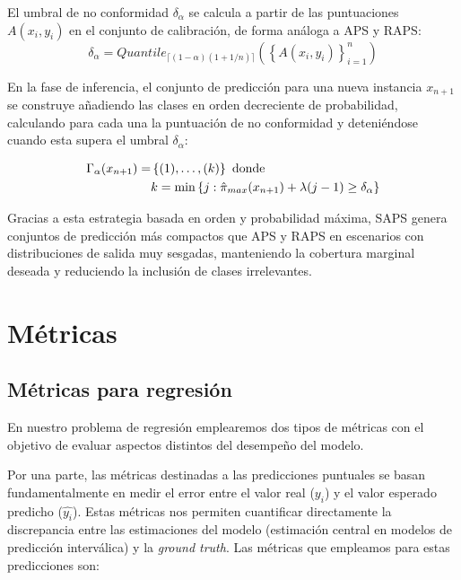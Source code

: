 El umbral de no conformidad $\delta_\alpha$ se calcula a partir de las puntuaciones $A(x_i, y_i)$ en el conjunto de calibración, de forma análoga a APS y RAPS:
$$
\delta_\alpha = Quantile_{\lceil (1-\alpha)(1+1/n) \rceil} \left( \left\{ A(x_i, y_i) \right\}_{i=1}^n \right)
$$

En la fase de inferencia, el conjunto de predicción para una nueva instancia $x_{n+1}$ se construye añadiendo las clases en orden decreciente de probabilidad, calculando para cada una la puntuación de no conformidad y deteniéndose cuando esta supera el umbral $\delta_\alpha$:

\begin{align*}
\Gamma_\alpha(x_{n+1}) = &\left\{ (1), \dots, (k) \right\} \ \textnormal{donde} \\
& k = \min \left\{ j : \hat{\pi}_{max}(x_{n+1}) + \lambda (j - 1) \ge \delta_\alpha \right\}
\end{align*}

Gracias a esta estrategia basada en orden y probabilidad máxima, SAPS genera conjuntos de predicción más compactos que APS y RAPS en escenarios con distribuciones de salida muy sesgadas, manteniendo la cobertura marginal deseada y reduciendo la inclusión de clases irrelevantes.



\section{Métricas}


\subsection{Métricas para regresión}

En nuestro problema de regresión emplearemos dos tipos de métricas con el objetivo de evaluar aspectos distintos del desempeño del modelo.

Por una parte, las métricas destinadas a las predicciones puntuales se basan fundamentalmente en medir el error entre el valor real ($y_i$) y el valor esperado predicho ($\hat{y_i}$). Estas métricas nos permiten cuantificar directamente la discrepancia entre las estimaciones del modelo (estimación central en modelos de predicción interválica) y la \textit{ground truth}. Las métricas que empleamos para estas predicciones son:

